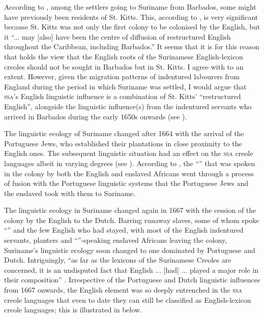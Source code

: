 According to \citet{Rens53}, among the settlers going to Suriname from Barbados, some might have previously been residents of St. Kitts. This, according to \citet[117]{Arends02}, is very significant because St. Kitts was not only the first colony to be colonised by the English, but it ``... may [also] have been the centre of diffusion of restructured English throughout the Caribbean, including Barbados.'' It seems that it is for this reason that \citet{Arends02} holds the view that the English roots of the Surinamese English-lexicon creoles should not be sought in Barbados but in St. Kitts. I agree with \citet{Arends02} to an extent. However, given the migration patterns of indentured labourers from England during the period in which Suriname was settled, I would argue that \textsc{ssa}'s English linguistic influence is a combination of St. Kitts'  ``restructured English'', alongside the linguistic influence(s) from the indentured servants who arrived in Barbados during the early 1650s onwards (see ).

The linguistic ecology of Suriname changed after 1664 with the arrival of the Portuguese Jews, who established their plantations in close proximity to the English ones. The subsequent linguistic situation had an effect on the \textsc{ssa}  creole languages albeit in varying degrees (see ). According to \citet{Rens53}, the ``''  that was spoken in the colony by both the English and enslaved Africans went through a process of fusion with the Portuguese linguistic systems that the Portuguese Jews and the enslaved took with them to Suriname.

The linguistic ecology in Suriname changed again in 1667 with the cession of the colony by the English to the Dutch. Barring runaway slaves, some of whom spoke ``'' and the few English who had stayed, with most of the English indentured servants, planters and ``''-speaking enslaved Africans leaving the colony, Suriname's linguistic ecology soon changed to one dominated by Portuguese and Dutch. Intriguingly, ``as far as the lexicons of the Surinamese Creoles are concerned, it is an undisputed fact that English ... [had] ... played a major role in their composition'' \citep[117]{Arends02}. Irrespective of the Portuguese and Dutch linguistic influences from 1667 onwards, the English element was so deeply entrenched in the \textsc{ssa} creole languages that even to date they can still be classified as English-lexicon creole languages; this is illustrated in  below.

